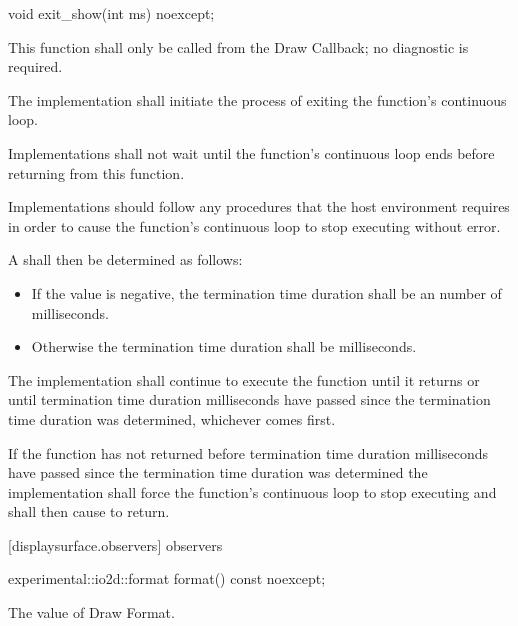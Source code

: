 \begin{itemdecl}
void exit_show(int ms) noexcept;
\end{itemdecl}
\begin{itemdescr}
\pnum
\requires
This function shall only be called from the Draw Callback; no diagnostic is required.

\pnum
\effects
The implementation shall initiate the process of exiting the  function's continuous loop.

\pnum
Implementations shall not wait until the  function's continuous loop ends before returning from this function.

\pnum
Implementations should follow any procedures that the host environment requires in order to cause the  function's continuous loop to stop executing without error.

\pnum
A  shall then be determined as follows:
\begin{itemize}
\item If the value  is negative, the termination time duration shall be an \unspecnorm number of milliseconds.
\item Otherwise the termination time duration shall be  milliseconds.
\end{itemize}

\pnum
The implementation shall continue to execute the  function until it returns or until termination time duration milliseconds have passed since the termination time duration was determined, whichever comes first.

\pnum
If the  function has not returned before termination time duration milliseconds have passed since the termination time duration was determined the implementation shall force the  function's continuous loop to stop executing and shall then cause  to return.
\end{itemdescr}

 [displaysurface.observers]{ observers}

\begin{itemdecl}
experimental::io2d::format format() const noexcept;
\end{itemdecl}
\begin{itemdescr}
\pnum
\returns
The value of Draw Format.
\end{itemdescr}

